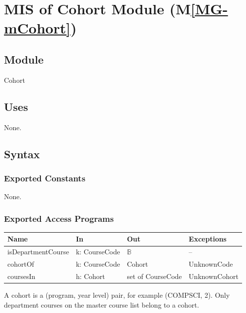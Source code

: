 \documentclass[12pt, titlepage]{article}
\newcommand{\mref}[1]{M\ref{MG-#1}}
\begin{document}
\newpage


\section{MIS of Cohort Module (\mref{mCohort})} \label{mis-mCohort}

\subsection{Module}

Cohort

\subsection{Uses}

None.

\subsection{Syntax}

\subsubsection{Exported Constants}

None.

\subsubsection{Exported Access Programs}

\begin{center}\small
\begin{tabular}{>{\raggedright\arraybackslash}p{3.4cm} >{\raggedright\arraybackslash}p{3.3cm} >{\raggedright\arraybackslash}p{4.1cm} >{\raggedright\arraybackslash}p{3.8cm}}
\hline
\textbf{Name} & \textbf{In} & \textbf{Out} & \textbf{Exceptions} \\
\hline
isDepartmentCourse & k: CourseCode & $\mathbb{B}$ & -- \\
cohortOf & k: CourseCode & Cohort & UnknownCode \\
coursesIn & h: Cohort & set of CourseCode & UnknownCohort \\
\hline
\end{tabular}
\end{center}

\noindent A cohort is a (program, year level) pair, for example (COMPSCI, 2).
Only department courses on the master course list belong to a cohort.
\end{document}
